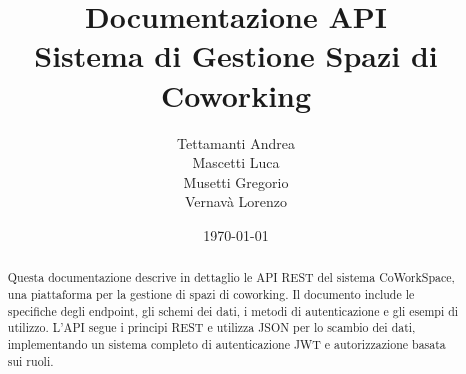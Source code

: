 \documentclass[12pt,a4paper]{article}
\title{
    \vspace{-2cm}
    {\Huge \textbf{Documentazione API}}\\
    \vspace{0.5cm}
    {\large Sistema di Gestione Spazi di Coworking}
}
\author{Tettamanti Andrea \\
        Mascetti Luca \\
        Musetti Gregorio \\
        Vernavà Lorenzo}
\date{\today}
\begin{document}
\maketitle

\newpage

\begin{abstract}
Questa documentazione descrive in dettaglio le API REST del sistema CoWorkSpace, una piattaforma per la gestione di spazi di coworking. Il documento include le specifiche degli endpoint, gli schemi dei dati, i metodi di autenticazione e gli esempi di utilizzo. L'API segue i principi REST e utilizza JSON per lo scambio dei dati, implementando un sistema completo di autenticazione JWT e autorizzazione basata sui ruoli.
\end{abstract}

\newpage
\tableofcontents
\newpage






\end{document}
